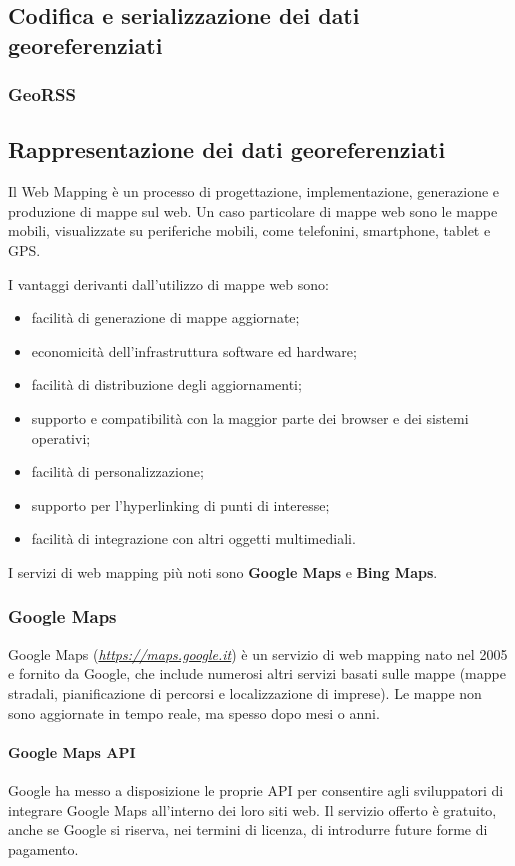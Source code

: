 \subsection{Codifica e serializzazione dei dati georeferenziati}
\subsubsection{GeoRSS}


\subsection{Rappresentazione dei dati georeferenziati}
Il Web Mapping è un processo di progettazione, implementazione, generazione e produzione di mappe sul web.
Un caso particolare di mappe web sono le mappe mobili, visualizzate su periferiche mobili, come telefonini, smartphone, tablet e GPS.

I vantaggi derivanti dall'utilizzo di mappe web sono:
\begin{itemize}
\item facilità di generazione di mappe aggiornate;
\item economicità dell'infrastruttura software ed hardware;
\item facilità di distribuzione degli aggiornamenti;
\item supporto e compatibilità con la maggior parte dei browser e dei sistemi operativi;
\item facilità di personalizzazione;
\item supporto per l'hyperlinking di punti di interesse;
\item facilità di integrazione con altri oggetti multimediali.
\end{itemize}

I servizi di web mapping più noti sono \textbf{Google Maps} e \textbf{Bing Maps}.
\subsubsection{Google Maps}
Google Maps (\emph{\url{https://maps.google.it}}) è un servizio di web mapping nato nel 2005 e fornito da Google, che include numerosi altri servizi basati sulle mappe (mappe stradali, pianificazione di percorsi e localizzazione di imprese).
Le mappe non sono aggiornate in tempo reale, ma spesso dopo mesi o anni.
\paragraph{Google Maps API}
Google ha messo a disposizione le proprie API per consentire agli sviluppatori di integrare Google Maps all'interno dei loro siti web.
Il servizio offerto è gratuito, anche se Google si riserva, nei termini di licenza, di introdurre future forme di pagamento.

